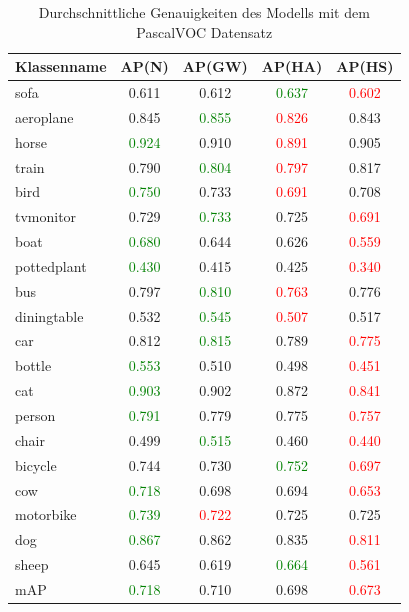 \begin{table}
[h]
\caption{Durchschnittliche Genauigkeiten des Modells mit dem PascalVOC Datensatz}
\centering
\begin{tabular}{|l|c|c|c|c|}
\hline
Klassenname & AP(N) & AP(GW) & AP(HA) & AP(HS)\\
\hline
sofa & 0.611 & 0.612 & \textcolor{green}{0.637} & \textcolor{red}{0.602}\\ 
aeroplane & 0.845 & \textcolor{green}{0.855} & \textcolor{red}{0.826} & 0.843\\
horse & \textcolor{green}{0.924} & 0.910 & \textcolor{red}{0.891} & 0.905\\
train & 0.790 & \textcolor{green}{0.804} & \textcolor{red}{0.797} & 0.817\\
bird & \textcolor{green}{0.750} & 0.733 & \textcolor{red}{0.691} & 0.708\\ 
tvmonitor & 0.729 & \textcolor{green}{0.733} & 0.725 & \textcolor{red}{0.691}\\
boat & \textcolor{green}{0.680} & 0.644 & 0.626 & \textcolor{red}{0.559}\\
pottedplant & \textcolor{green}{0.430} & 0.415 & 0.425 & \textcolor{red}{0.340}\\
bus & 0.797 & \textcolor{green}{0.810} & \textcolor{red}{0.763} & 0.776\\ 
diningtable & 0.532 & \textcolor{green}{0.545} & \textcolor{red}{0.507} & 0.517\\
car & 0.812 & \textcolor{green}{0.815} & 0.789 & \textcolor{red}{0.775}\\
bottle & \textcolor{green}{0.553} & 0.510 & 0.498 & \textcolor{red}{0.451}\\
cat & \textcolor{green}{0.903} & 0.902 & 0.872 & \textcolor{red}{0.841}\\
person & \textcolor{green}{0.791} & 0.779 & 0.775 & \textcolor{red}{0.757}\\
chair & 0.499 & \textcolor{green}{0.515} & 0.460 & \textcolor{red}{0.440}\\
bicycle & 0.744 & 0.730 & \textcolor{green}{0.752} & \textcolor{red}{0.697}\\
cow & \textcolor{green}{0.718} & 0.698 & 0.694 & \textcolor{red}{0.653}\\
motorbike & \textcolor{green}{0.739} & \textcolor{red}{0.722} & 0.725 & 0.725\\
dog & \textcolor{green}{0.867} & 0.862 & 0.835 & \textcolor{red}{0.811}\\
sheep & 0.645 & 0.619 & \textcolor{green}{0.664} & \textcolor{red}{0.561}\\
\hline
mAP & \textcolor{green}{0.718} & 0.710 & 0.698 & \textcolor{red}{0.673}\\
\hline
\end{tabular}
\end{table}
